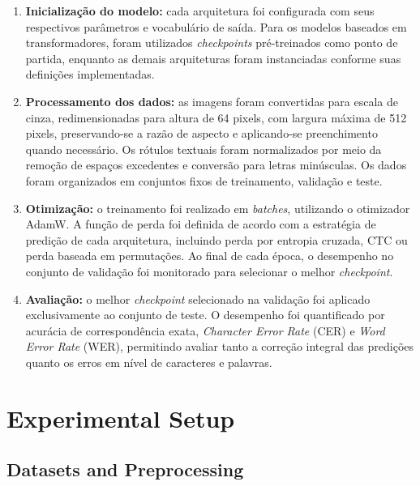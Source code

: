 \documentclass[11pt,a4paper]{article}
\begin{document}
\begin{enumerate}
	\item \textbf{Inicialização do modelo:} cada arquitetura foi configurada com
	seus respectivos parâmetros e vocabulário de saída. Para os modelos baseados
	em transformadores, foram utilizados \textit{checkpoints} pré-treinados como
	ponto de partida, enquanto as demais arquiteturas foram instanciadas conforme
	suas definições implementadas.
	
	\item \textbf{Processamento dos dados:} as imagens foram convertidas para
	escala de cinza, redimensionadas para altura de 64 pixels, com largura máxima
	de 512 pixels, preservando-se a razão de aspecto e aplicando-se preenchimento	
	quando necessário. Os rótulos textuais foram normalizados por meio da remoção
	de espaços excedentes e conversão para letras minúsculas. Os dados foram
	organizados em conjuntos fixos de treinamento, validação e teste.
	
	\item \textbf{Otimização:} o treinamento foi realizado em \textit{batches},
	utilizando o otimizador AdamW. A função de perda foi definida de acordo com a
	estratégia de predição de cada arquitetura, incluindo perda por entropia
	cruzada, CTC ou perda baseada em permutações. Ao final de cada época, o
	desempenho no conjunto de validação foi monitorado para selecionar o melhor
	\textit{checkpoint}.
	
	\item \textbf{Avaliação:} o melhor \textit{checkpoint} selecionado na
	validação foi aplicado exclusivamente ao conjunto de teste. O desempenho foi
	quantificado por acurácia de correspondência exata, \textit{Character Error
		Rate} (CER) e \textit{Word Error Rate} (WER), permitindo avaliar tanto a
	correção integral das predições quanto os erros em nível de caracteres e
	palavras.
\end{enumerate}

\section{Experimental Setup}
\label{sec:experiments}

\subsection{Datasets and Preprocessing}
\label{sec:datasets}
\end{document}
